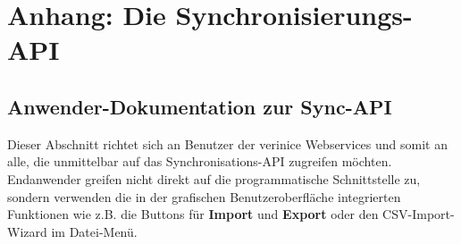 \documentclass[a4paper,10pt]{book}
\begin{document}
\chapter{Anhang: Die Synchronisierungs-API}

\section{Anwender-Dokumentation zur Sync-API}
Dieser Abschnitt richtet sich an Benutzer der verinice Webservices und somit an alle,
die unmittelbar auf das Synchronisations-API zugreifen möchten.
\newline
Endanwender greifen nicht direkt auf die programmatische Schnittstelle zu,
sondern verwenden die in der grafischen Benutzeroberfläche integrierten
Funktionen wie z.B. die Buttons für \textbf{Import} und \textbf{Export} oder den
CSV-Import-Wizard im Datei-Menü.
\end{document}
